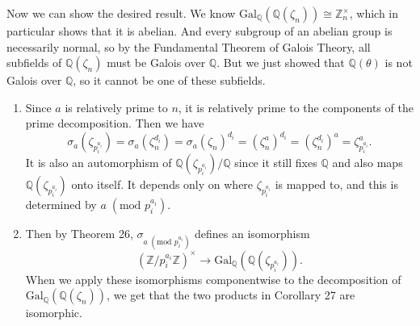 \documentclass[10pt]{report}
\begin{document}
Now we can show the desired result. We know $\text{Gal}_{\mathbb{Q}}(\mathbb{Q}(\zeta_{n})) \cong \mathbb{Z}_{n}^{\times}$, which in particular shows that it is abelian. And every subgroup of an abelian group is necessarily normal, so by the Fundamental Theorem of Galois Theory, all subfields of $\mathbb{Q}(\zeta_{n})$ must be Galois over $\mathbb{Q}$. But we just showed that $\mathbb{Q}(\theta)$ is not Galois over $\mathbb{Q}$, so it cannot be one of these subfields.

\pagebreak
\begin{exer}[14.5: 13]
\end{exer}
\begin{enumerate}
	\item Since $a$ is relatively prime to $n$, it is relatively prime to the components of the prime decomposition. Then we have
		\[
			\sigma_{a}(\zeta_{p_i^{a_i}}) = \sigma_{a}(\zeta_{n}^{d_i}) = \sigma_{a}(\zeta_{n})^{d_i}= (\zeta_{n}^{a})^{d_i}= (\zeta_{n}^{d_i})^a=\zeta_{p_i^{a_i}}^{a}.
		\] It is also an automorphism of $\mathbb{Q}(\zeta_{p_i^{a_i}})/\mathbb{Q}$ since it still fixes $\mathbb{Q}$ and also maps $\mathbb{Q}(\zeta_{p_i^{a_i}})$ onto itself. It depends only on where $\zeta_{p_i^{a_i}}$ is mapped to, and this is determined by $a \; (\text{mod } p_i^{a_i})$.

	\item Then by Theorem 26, $\sigma_{a \; (\text{mod }p_i^{a_i})}$ defines an isomorphism
		\[
			(\mathbb{Z}/p_i^{a_i}\mathbb{Z})^{\times} \to \text{Gal}_{\mathbb{Q}}(\mathbb{Q}(\zeta_{p_i^{a_i}})).
		\] When we apply these isomorphisms componentwise to the decomposition of $\text{Gal}_{\mathbb{Q}}(\mathbb{Q}(\zeta_{n}))$, we get that the two products in Corollary 27 are isomorphic.
\end{enumerate}
\end{document}
